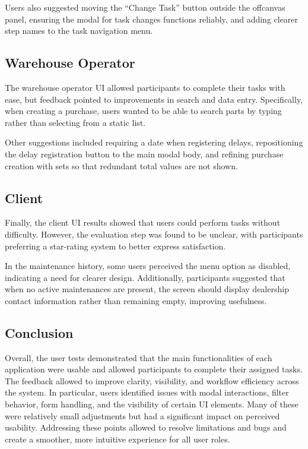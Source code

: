 Users also suggested moving the “Change Task” button outside the offcanvas panel, ensuring the modal for task changes functions reliably, and adding clearer step names to the task navigation menu.

\subsection{Warehouse Operator}

The warehouse operator \ac{UI} allowed participants to complete their tasks with ease, but feedback pointed to improvements in search and data entry. Specifically, when creating a purchase, users wanted to be able to search parts by typing rather than selecting from a static list.

Other suggestions included requiring a date when registering delays, repositioning the delay registration button to the main modal body, and refining purchase creation with sets so that redundant total values are not shown.

\subsection{Client}

Finally, the client \ac{UI} results showed that users could perform tasks without difficulty. However, the evaluation step was found to be unclear, with participants preferring a star-rating system to better express satisfaction.

In the maintenance history, some users perceived the menu option as disabled, indicating a need for clearer design. Additionally, participants suggested that when no active maintenances are present, the screen should display dealership contact information rather than remaining empty, improving usefulness.


\subsection{Conclusion}

Overall, the user tests demonstrated that the main functionalities of each application were usable and allowed participants to complete their assigned tasks. The feedback allowed to improve clarity, visibility, and workflow efficiency across the system. In particular, users identified issues with modal interactions, filter behavior, form handling, and the visibility of certain \ac{UI} elements. Many of these were relatively small adjustments but had a significant impact on perceived usability. Addressing these points allowed to resolve  limitations and bugs and create a smoother, more intuitive experience for all user roles.

